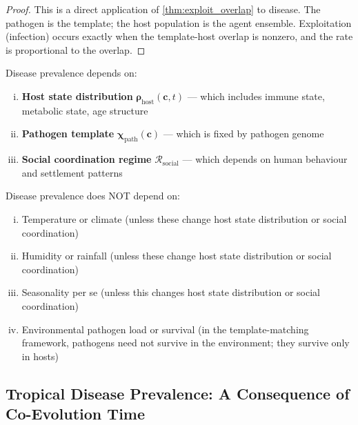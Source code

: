 \documentclass[11pt,twocolumn,a4paper]{article}
\newcommand{\Template}{\boldsymbol{\chi}}
\newcommand{\State}{\boldsymbol{\rho}}
\newcommand{\Coord}{\mathcal{R}}
\begin{document}
\begin{proof}
This is a direct application of \cref{thm:exploit_overlap} to disease. The pathogen is the template; the host population is the agent ensemble. Exploitation (infection) occurs exactly when the template-host overlap is nonzero, and the rate is proportional to the overlap.
\end{proof}

\begin{corollary}
Disease prevalence depends on:
\begin{enumerate}[(i)]
\item \textbf{Host state distribution} $\State_{\mathrm{host}}(\mathbf{c}, t)$ — which includes immune state, metabolic state, age structure
\item \textbf{Pathogen template} $\Template_{\mathrm{path}}(\mathbf{c})$ — which is fixed by pathogen genome
\item \textbf{Social coordination regime} $\Coord_{\mathrm{social}}$ — which depends on human behaviour and settlement patterns
\end{enumerate}
Disease prevalence does NOT depend on:
\begin{enumerate}[(i)]
\item Temperature or climate (unless these change host state distribution or social coordination)
\item Humidity or rainfall (unless these change host state distribution or social coordination)
\item Seasonality per se (unless this changes host state distribution or social coordination)
\item Environmental pathogen load or survival (in the template-matching framework, pathogens need not survive in the environment; they survive only in hosts)
\end{enumerate}
\end{corollary}

\subsection{Tropical Disease Prevalence: A Consequence of Co-Evolution Time}
\end{document}
